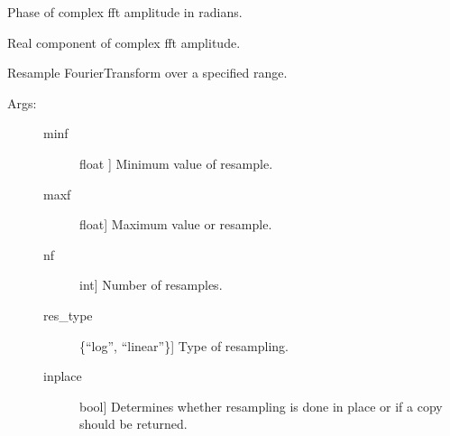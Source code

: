 \documentclass[letterpaper,10pt,english]{sphinxmanual}
\begin{document}
\begin{fulllineitems}

\begin{fulllineitems}
\label{\detokenize{index:sigpropy.FourierTransform.phase}}
Phase of complex fft amplitude in radians.

\end{fulllineitems}


\begin{fulllineitems}
\label{\detokenize{index:sigpropy.FourierTransform.real}}
Real component of complex fft amplitude.

\end{fulllineitems}


\begin{fulllineitems}
\label{\detokenize{index:sigpropy.FourierTransform.resample}}
Resample FourierTransform over a specified range.
\begin{description}
\item[{Args:}] \leavevmode\begin{description}
\item[{minf}] \leavevmode{[}float {]}
Minimum value of resample.

\item[{maxf}] \leavevmode{[}float{]}
Maximum value or resample.

\item[{nf}] \leavevmode{[}int{]}
Number of resamples.

\item[{res\_type}] \leavevmode{[}\{“log”, “linear”\}{]}
Type of resampling.

\item[{inplace}] \leavevmode{[}bool{]}
Determines whether resampling is done in place or 
if a copy should be returned.

\end{description}


\end{description}
\end{fulllineitems}
\end{fulllineitems}
\end{document}
